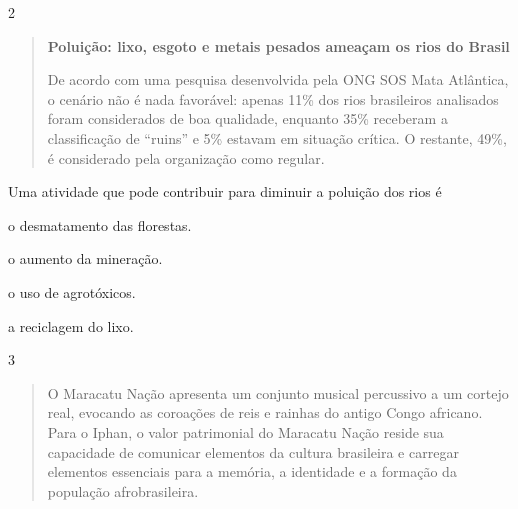 \num{2}

\begin{quote}
\textbf{Poluição: lixo, esgoto e metais pesados ameaçam os rios do
Brasil}

De acordo com uma pesquisa desenvolvida pela ONG SOS Mata Atlântica, o
cenário não é nada favorável: apenas 11\% dos rios brasileiros
analisados foram considerados de boa qualidade, enquanto 35\% receberam
a classificação de ``ruins'' e 5\% estavam em situação crítica. O
restante, 49\%, é considerado pela organização como regular.

\end{quote}

Uma atividade que pode contribuir para diminuir a poluição dos rios é

\begin{escolha}
\item o desmatamento das florestas.

\item o aumento da mineração.

\item o uso de agrotóxicos.

\item a reciclagem do lixo.
\end{escolha}


\num{3}


\begin{quote}
O Maracatu Nação apresenta um conjunto musical percussivo a um cortejo
real, evocando as coroações de reis e rainhas do antigo Congo africano.
Para o Iphan, o valor patrimonial do Maracatu Nação reside sua
capacidade de comunicar elementos da cultura brasileira e carregar
elementos essenciais para a memória, a identidade e a formação da
população afrobrasileira.

\end{quote}

